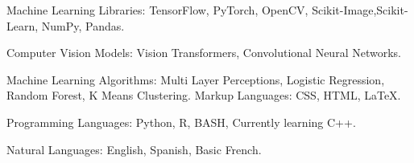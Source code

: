 

\begin{cvskills}

  \cvskill
    {\color{dm-logo}Machine Learning Libraries:} %
    {TensorFlow, PyTorch, OpenCV, Scikit-Image,\newline Scikit-Learn, NumPy, Pandas.} %

  \cvskill
    {\color{dm-logo}Computer Vision Models:} %
    {Vision Transformers, \newline Convolutional Neural  Networks.} %

   \cvskill
   {\color{dm-logo} Machine Learning Algorithms:}
   {Multi Layer Perceptions, Logistic Regression, \newline Random Forest, K Means Clustering.}
  \cvskill
    {\color{dm-logo}Markup Languages:} %
    {CSS, HTML, LaTeX.} %

  \cvskill
    {\color{dm-logo}Programming Languages:} %
    {Python, R, BASH, Currently learning C++.} %

  \cvskill
    {\color{dm-logo}Natural Languages:} %
    {English, Spanish, Basic French.} %
\end{cvskills}
\newpage
